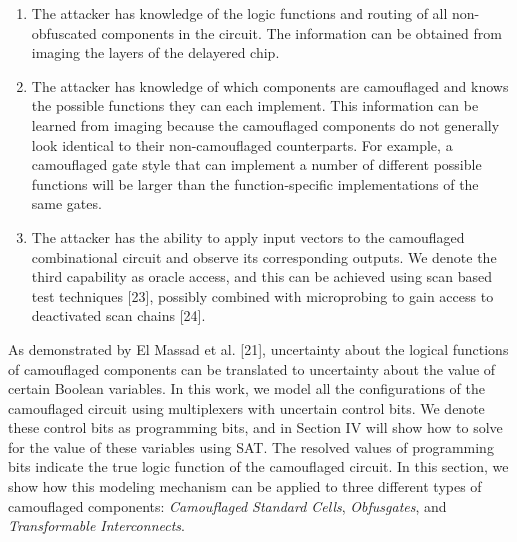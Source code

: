 \documentclass[proposal]{umassthesis}  %
\begin{document}
\begin{enumerate}
\item The attacker has knowledge of the logic functions and routing of all non-obfuscated components in the circuit. The information can be obtained from imaging the layers of the delayered chip.
\item The attacker has knowledge of which components are camouflaged and knows the possible functions they can each implement. This information can be learned from imaging because the camouflaged components do not generally look identical to their non-camouflaged counterparts. For example, a camouflaged gate style that can implement a number of different possible functions will be larger than the function-specific implementations of the same gates.
\item The attacker has the ability to apply input vectors to the camouflaged combinational circuit and observe its corresponding outputs. We denote the third capability as oracle access, and this can be achieved using scan based test techniques [23], possibly combined with microprobing to gain access to deactivated scan chains [24]. \end{enumerate}

As demonstrated by El Massad et al. [21], uncertainty about the logical functions of camouflaged components can be translated to uncertainty about the value of certain Boolean variables. In this work, we model all the configurations of the camouflaged circuit using multiplexers with uncertain control bits. We denote these control bits as programming bits, and in Section IV will show how to solve for the value of these variables using SAT.  The resolved values of programming bits indicate the true logic function of the camouflaged circuit.
In this section, we show how this modeling mechanism can be applied to three different types of camouflaged components: \textit{Camouflaged Standard Cells}, \textit{Obfusgates}, and \textit{Transformable Interconnects}.




















\end{document}
